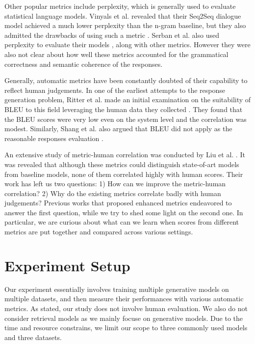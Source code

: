 \documentclass[conference]{IEEEtran}
\begin{document}
Other popular metrics include perplexity, which is generally used to evaluate statistical language models. Vinyals et al. revealed that their Seq2Seq dialogue model achieved a much lower perplexity than the n-gram baseline, but they also admitted the drawbacks of using such a metric \cite{GoogleChatbot}. Serban et al. also used perplexity to evaluate their models \cite{HRED}, along with other metrics. However they were also not clear about how well these metrics accounted for the grammatical correctness and semantic coherence of the responses.

Generally, automatic metrics have been constantly doubted of their capability to reflect human judgements. In one of the earliest attempts to the response generation problem, Ritter et al. made an initial examination on the suitability of BLEU to this field leveraging the human data they collected \cite{Ritter11}. They found that the BLEU scores were very low even on the system level and the correlation was modest. Similarly, Shang et al. also argued that BLEU did not apply as the reasonable responses evaluation \cite{Shang}.

An extensive study of metric-human correlation was conducted by Liu et al. \cite{HowNot}. It was revealed that although these metrics could distinguish state-of-art models from baseline models, none of them correlated highly with human scores. Their work has left us two questions: 1) How can we improve the metric-human correlation? 2) Why do the existing metrics correlate badly with human judgements? Previous works that proposed enhanced metrics endeavored to answer the first question, while we try to shed some light on the second one. In particular, we are curious about what can we learn when scores from different metrics are put together and compared across various settings.


\section{Experiment Setup}
Our experiment essentially involves training multiple generative models on multiple datasets, and then measure their performances with various automatic metrics. As stated, our study does not involve human evaluation. We also do not consider retrieval models as we mainly focuse on generative models. Due to the time and resource constrains, we limit our scope to three commonly used models and three datasets.

\end{document}
